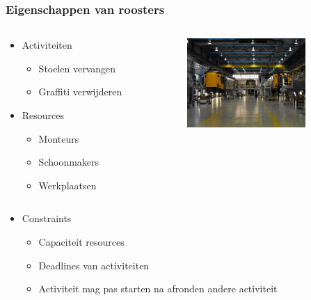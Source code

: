 \begin{frame}\frametitle{Eigenschappen van roosters}
	\begin{columns}[T]
	    \begin{column}{.4\textwidth}
			\begin{itemize}
		        \item Activiteiten
		        \begin{itemize}
		            \item Stoelen vervangen
		            \item Graffiti verwijderen      
		        \end{itemize}
		        \item Resources
	            \begin{itemize}
	                \item Monteurs
	                \item Schoonmakers
	                \item Werkplaatsen
	            \end{itemize}
		    \end{itemize}
	    \end{column}
	    \begin{column}{.5\textwidth}
	    	\includegraphics[width=4.5cm]{images/werkplaats.jpg}
	    \end{column}
  	\end{columns}
    \begin{itemize}
        \item Constraints
        \begin{itemize}
        	\item Capaciteit resources
            \item Deadlines van activiteiten
            \item Activiteit mag pas starten na afronden andere activiteit 
        \end{itemize}
    \end{itemize}
\end{frame}

